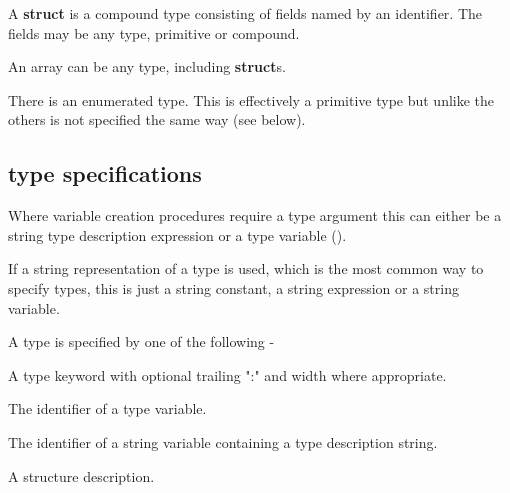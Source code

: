         A {\bf struct} is a compound type consisting of fields named by
        an identifier. The fields may be any type, primitive or compound.

        An array can be any type, including {\bf struct}s.
        
        There is an enumerated type. This is effectively a primitive type
        but unlike the others is not specified the same way (see below).

        \subsection{type specifications}
        
            Where variable creation procedures require a type argument
            this can either be a string type description expression or
            a type variable ().
            
            If a string representation of a type is used, which is the most
            common way to specify types, this is just a string constant,
            a string expression or a string variable.
            
            A type is specified by one of the following -
            \blist
            \item   A type keyword with optional trailing ":" and width
                    where appropriate.
            \item   The identifier of a type variable.
            \item   The identifier of a string variable containing a type
                    description string.
            \item   A structure description.
            \blend

